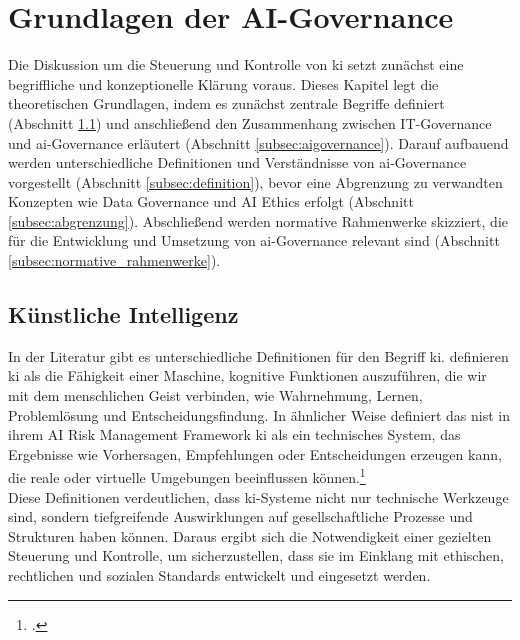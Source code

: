 \section{Grundlagen der AI-Governance}
\label{sec:theorie}
Die Diskussion um die Steuerung und Kontrolle von \ac{ki} setzt zunächst eine begriffliche und konzeptionelle Klärung voraus.
Dieses Kapitel legt die theoretischen Grundlagen, indem es zunächst zentrale Begriffe definiert (Abschnitt \ref{subsec:ki}) und anschließend den Zusammenhang zwischen IT-Governance und \ac{ai}-Governance erläutert (Abschnitt \ref{subsec:aigovernance}).
Darauf aufbauend werden unterschiedliche Definitionen und Verständnisse von \ac{ai}-Governance vorgestellt (Abschnitt \ref{subsec:definition}), bevor eine Abgrenzung zu verwandten Konzepten wie Data Governance und AI Ethics erfolgt (Abschnitt \ref{subsec:abgrenzung}).
Abschließend werden normative Rahmenwerke skizziert, die für die Entwicklung und Umsetzung von \ac{ai}-Governance relevant sind (Abschnitt \ref{subsec:normative_rahmenwerke}).

\subsection{Künstliche Intelligenz}
\label{subsec:ki}
In der Literatur gibt es unterschiedliche Definitionen für den Begriff \acf{ki}.
\cite[3]{raiNextGenerationDigitalPlatforms2019} definieren \ac{ki} als \glqq{}die Fähigkeit einer Maschine, kognitive Funktionen auszuführen, die wir mit dem menschlichen Geist verbinden, wie Wahrnehmung, Lernen, Problemlösung und Entscheidungsfindung.\grqq{}
In ähnlicher Weise definiert das \ac{nist} in ihrem AI Risk Management Framework \ac{ki} als ein technisches System, das Ergebnisse wie Vorhersagen, Empfehlungen oder Entscheidungen erzeugen kann, die reale oder virtuelle Umgebungen beeinflussen können.\footcite[1]{nationalinstituteofstandardsandtechnologyAIRiskManagement2021}
\\
Diese Definitionen verdeutlichen, dass \ac{ki}-Systeme nicht nur technische Werkzeuge sind, sondern tiefgreifende Auswirklungen auf gesellschaftliche Prozesse und Strukturen haben können.
Daraus ergibt sich die Notwendigkeit einer gezielten Steuerung und Kontrolle, um sicherzustellen, dass sie im Einklang mit ethischen, rechtlichen und sozialen Standards entwickelt und eingesetzt werden.

